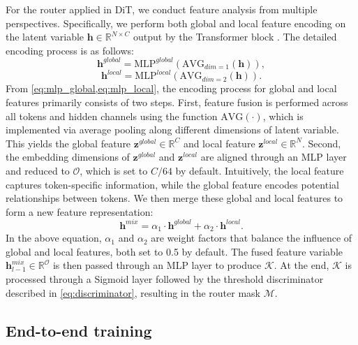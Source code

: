 For the router applied in DiT, we conduct feature analysis from multiple perspectives. Specifically, we perform both global and local feature encoding on the latent variable $\mathbf{h}\in\mathbb{R}^{N\times C}$ output by the Transformer block \cite{rao2021dynamicvit, rao2023dynamic}. The detailed encoding process is as follows:
\begin{equation}
    \mathbf{h}^{global}=\mathrm{MLP}^{global}\left(\mathrm{AVG}_{dim=1}\left(\mathbf{h}\right)\right),
\label{eq:mlp_global}
\end{equation}
\begin{equation}
    \mathbf{h}^{local}=\mathrm{MLP}^{local}\left(\mathrm{AVG}_{dim=2}\left(\mathbf{h}\right)\right).
\label{eq:mlp_local}
\end{equation}
From \cref{eq:mlp_global,eq:mlp_local}, the encoding process for global and local features primarily consists of two steps. First, feature fusion is performed across all tokens and hidden channels using the function $\mathrm{AVG\left(\cdot\right)}$, which is implemented via average pooling along different dimensions of latent variable. This yields the global feature $\mathbf{z}^{global}\in \mathbb{R}^{C}$ and local feature $\mathbf{z}^{local}\in \mathbb{R}^{N}$. Second, the embedding dimensions of $\mathbf{z}^{global}$ and $\mathbf{z}^{local}$ are aligned through an MLP layer and reduced to $\mathcal{O}$, which is set to $C/64$ by default. Intuitively, the local feature captures token-specific information, while the global feature encodes potential relationships between tokens. We then merge these global and local features to form a new feature representation:
\begin{equation}
    \mathbf{h}^{mix}=\alpha_{1}\cdot \mathbf{h}^{global}+\alpha_{2}\cdot \mathbf{h}^{local}.
\end{equation}
In the above equation, $\alpha_{1}$ and $\alpha_{2}$ are weight factors that balance the influence of global and local features, both set to 0.5 by default. The fused feature variable $\mathbf{h}_{l-1}^{mix}\in \mathbb{R}^{\mathcal{O}}$ is then passed through an MLP layer to produce $\mathcal{K}$. At the end, $\mathcal{K}$ is processed through a Sigmoid layer followed by the threshold discriminator described in \cref{eq:discriminator}, resulting in the router mask $\mathcal{M}$.

\subsection{End-to-end training}

